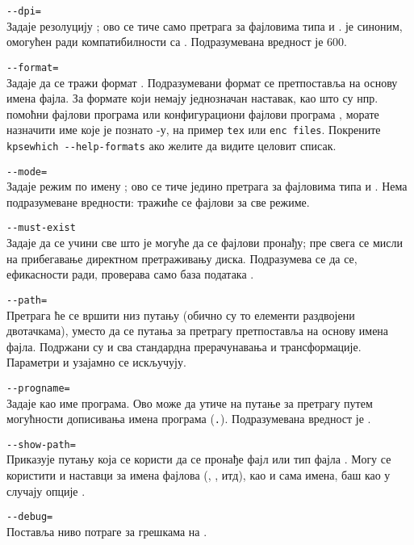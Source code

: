 \documentclass{article}
\begin{document}
\begin{ttdescription}
\item[\texttt{-{}-dpi=\var{num}}]\mbox{}\\
  Задаје резолуцију ; ово се тиче само претрага за
  фајловима типа  и .  је синоним, омогућен
  ради компатибилности са . Подразумевана вредност је
  600.

\item[\texttt{-{}-format=\var{name}}]\mbox{}\\
  Задаје да се тражи формат . Подразумевани формат се
  претпоставља на основу имена фајла. За формате који немају
  једнозначан наставак, као што су нпр. помоћни фајлови програма
  \MP{} или конфигурациони фајлови програма , морате
  назначити име које је познато \KPS{}-у, на пример \texttt{tex} или
  \texttt{enc files}. Покрените \texttt{kpsewhich -{}-help-formats} 
  ако желите да видите целовит списак.

\item[\texttt{-{}-mode=\var{string}}]\mbox{}\\
  Задаје режим по имену ; ово се тиче једино претрага
  за фајловима типа  и . Нема подразумеване
  вредности: тражиће се фајлови за све режиме.

\item[\texttt{-{}-must-exist}]\mbox{}\\
  Задаје да се учини све што је могуће да се фајлови пронађу; пре
  свега се мисли на прибегавање директном претраживању диска.
  Подразумева се да се, ефикасности ради, проверава само база података
  .

\item[\texttt{-{}-path=\var{string}}]\mbox{}\\
  Претрага ће се вршити низ путању  (обично су то
  елементи раздвојени двотачкама), уместо да се путања за претрагу
  претпоставља на основу имена фајла. Подржани су \samp{//} и сва
  стандардна прерачунавања и трансформације. Параметри 
  и  узајамно се искључују.

\item[\texttt{-{}-progname=\var{name}}]\mbox{}\\
  Задаје \texttt{} као име програма. Ово може да утиче на
  путање за претрагу путем могућности дописивања имена програма
  (\texttt{.}). Подразумевана вредност је
  .

\item[\texttt{-{}-show-path=\var{name}}]\mbox{}\\
  Приказује путању која се користи да се пронађе фајл или тип фајла
  \texttt{}. Могу се користити и наставци за имена фајлова
  (, , итд), као и сама имена, баш као у случају
  опције \hbox{}.

\item[\texttt{-{}-debug=\var{num}}]\mbox{}\\
  Поставља ниво потраге за грешкама на \texttt{}.
\end{ttdescription}
\end{document}
